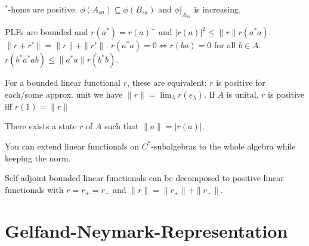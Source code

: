 \documentclass[a4paper, twocolumn, 10pt]{article}
\begin{document}
\begin{theorem}
    $^*$-homs are positive. $\phi(A_{sa}) \subseteq \phi(B_{sa})$ and $\phi|_{A_{sa}}$ is increasing.
\end{theorem}

\begin{theorem}
    PLFs are bounded and $r(a^*) = r(a)^-$ and $|r(a)|^2 \leq \|r\| r(a^* a)$.
    $\|r + r'\| = \|r\| + \|r'\|$.
    $r(a^* a) = 0 \iff r(ba) = 0$ for all $b \in A$.
    $r(b^* a^* ab) \leq \|a^*a\| r(b^*b)$.
\end{theorem}

\begin{theorem}
    For a bounded linear functional $r$, these are equivalent: $r$ is positive for each/some approx. unit we have $\|r\| = \lim_\lambda r(e_\lambda)$.
    If $A$ is unital, $r$ is positive iff $r(1) = \|r\|$ 
\end{theorem}

\begin{theorem}
    There exists a state $r$ of $A$ such that $\|a\| = |r(a)|$.
\end{theorem}

\begin{theorem}
    You can extend linear functionals on $C^*$-subalgebras to the whole algebra while keeping the norm.
\end{theorem}

\begin{theorem}
    Self-adjoint bounded linear functionals can be decomposed to positive linear functionals with $r = r_+ = r_-$ and $\|r\| = \|r_+\| + \|r_-\|$.
\end{theorem}

\section{Gelfand-Neymark-Representation}
\end{document}
